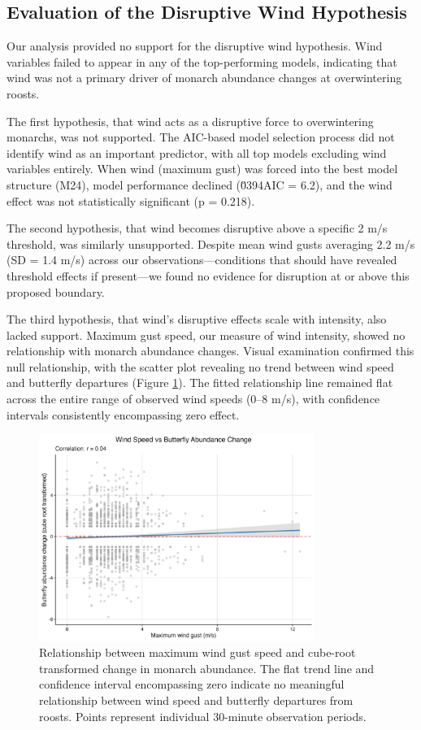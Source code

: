 \subsection{Evaluation of the Disruptive Wind Hypothesis}

Our analysis provided no support for the disruptive wind hypothesis. Wind variables failed to appear in any of the top-performing models, indicating that wind was not a primary driver of monarch abundance changes at overwintering roosts.

The first hypothesis, that wind acts as a disruptive force to overwintering monarchs, was not supported. The AIC-based model selection process did not identify wind as an important predictor, with all top models excluding wind variables entirely. When wind (maximum gust) was forced into the best model structure (M24), model performance declined (\u0394AIC = 6.2), and the wind effect was not statistically significant (p = 0.218).

The second hypothesis, that wind becomes disruptive above a specific 2 m/s threshold, was similarly unsupported. Despite mean wind gusts averaging 2.2 m/s (SD = 1.4 m/s) across our observations—conditions that should have revealed threshold effects if present—we found no evidence for disruption at or above this proposed boundary.

The third hypothesis, that wind's disruptive effects scale with intensity, also lacked support. Maximum gust speed, our measure of wind intensity, showed no relationship with monarch abundance changes. Visual examination confirmed this null relationship, with the scatter plot revealing no trend between wind speed and butterfly departures (Figure \ref{fig:wind_scatter}). The fitted relationship line remained flat across the entire range of observed wind speeds (0–8 m/s), with confidence intervals consistently encompassing zero effect.

\begin{figure}[htbp]
\centering
\includegraphics[width=0.8\textwidth]{supplemental/results/thesis_exports/figures/wind_hypothesis_scatter.png}
\caption{Relationship between maximum wind gust speed and cube-root transformed change in monarch abundance. The flat trend line and confidence interval encompassing zero indicate no meaningful relationship between wind speed and butterfly departures from roosts. Points represent individual 30-minute observation periods.}
\label{fig:wind_scatter}
\end{figure}

